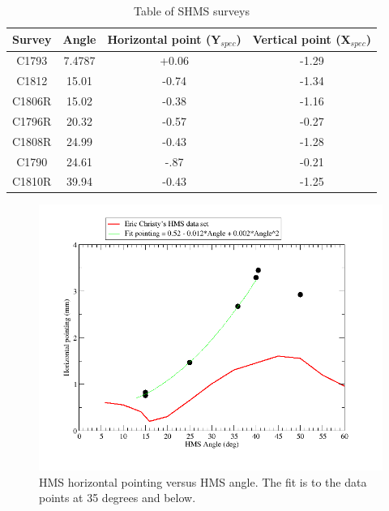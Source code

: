 \documentclass[]{article}
\begin{document}
			 	\begin{table}[h]
				\begin{center}
						\begin{tabular}[]{|c|c||c|c|} \hline\hline
		Survey & Angle  & Horizontal point (Y$_{spec}$) & Vertical point (X$_{spec}$)\\ \hline
        C1793  & 7.4787 & +0.06 & -1.29 \\ \hline
		C1812  & 15.01  & -0.74 & -1.34 \\ \hline
		C1806R & 15.02 & -0.38 & -1.16 \\ \hline
		C1796R & 20.32 & -0.57& -0.27\\ \hline
		C1808R & 24.99  & -0.43 & -1.28 \\ \hline
	    C1790  & 24.61 & -.87   &  -0.21 \\ \hline
		C1810R & 39.94  & -0.43 & -1.25 \\ \hline
		 		 	\end{tabular}
	\caption{Table of SHMS surveys}
	\label{tab:shms}
				\end{center}
				
	
		\end{table}
		\begin{figure}[h]	
			\begin{center}
				\includegraphics[width=0.8\columnwidth]{hms_horizontal_pointing.png}
			\end{center}
			\caption{HMS horizontal pointing versus HMS angle. The fit is to the data points at 35 degrees and below. }
			\label{fig:hms_horz_pointing}
		\end{figure}
		
\end{document}
